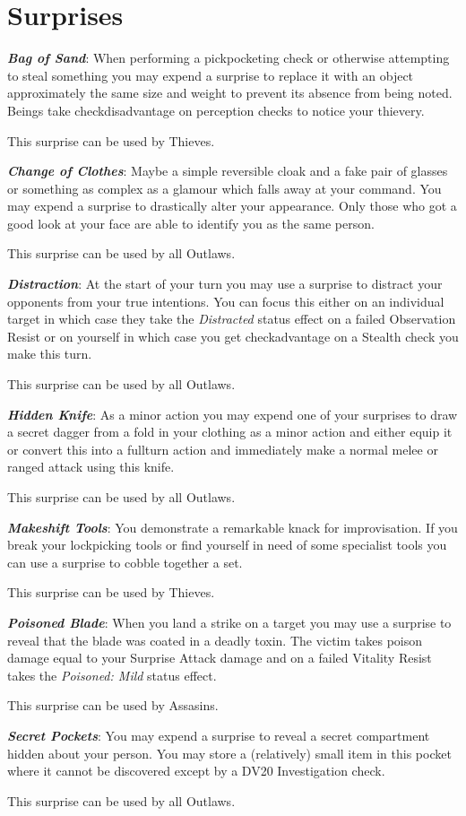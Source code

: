 \section*{Surprises}
\newcommand\surprise[3]
{
{\setlength\parskip{5 pt}
{\large \textbf{\textit{#1}}}: #2


This surprise can be used by {#3}. 

}
}
\surprise{Bag of Sand}{When performing a pickpocketing check\comma{} or otherwise attempting to steal something \minus{} you may expend a surprise to replace it with an object approximately the same size and weight\comma{} to prevent its absence from being noted. Beings take check\minus{}disadvantage on perception checks to notice your thievery.}{Thieves}
\surprise{Change of Clothes}{Maybe a simple reversible cloak\comma{} and a fake pair of glasses \minus{} or something as complex as a glamour which falls away at your command. You may expend a surprise to drastically alter your appearance. Only those who got a good look at your face are able to identify you as the same person.}{all Outlaws}
\surprise{Distraction}{At the start of your turn\comma{} you may use a surprise to distract your opponents from your true intentions. You can focus this either on an individual target  \minus{} in which case they take the {\it Distracted} status effect on a failed Observation Resist\comma{} or on yourself \minus{} in which case\comma{} you get check\minus{}advantage on a Stealth check you make this turn.}{all Outlaws}
\surprise{Hidden Knife}{As a minor action\comma{} you may expend one of your surprises to draw a secret dagger from a fold in your clothing as a minor action and either equip it\comma{} or convert this into a full\minus{}turn action and immediately make a normal melee or ranged attack using this knife.}{all Outlaws}
\surprise{Makeshift Tools}{You demonstrate a remarkable knack for improvisation. If you break your lockpicking tools\comma{} or find yourself in need of some specialist tools\comma{} you can use a surprise to cobble together a set.}{Thieves}
\surprise{Poisoned Blade}{When you land a strike on a target\comma{} you may use a surprise to reveal that the blade was coated in a deadly toxin. The victim takes poison damage equal to your Surprise Attack damage\comma{} and on a failed Vitality Resist takes the {\it Poisoned: Mild} status effect.}{Assasins}
\surprise{Secret Pockets}{You may expend a surprise to reveal a secret compartment\comma{} hidden about your person. You may store a (relatively) small item in this pocket\comma{} where it cannot be discovered except by a DV20 Investigation check.}{all Outlaws}
